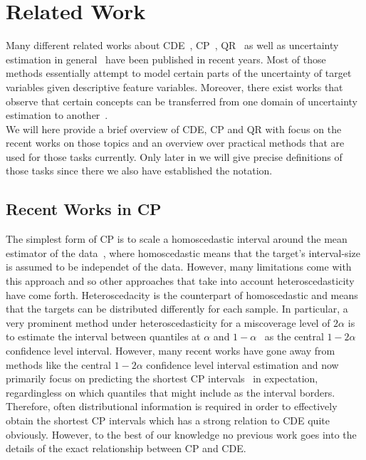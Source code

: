 \section{Related Work}\label{sec:related_work}

Many different related works about CDE~\cite{bishop1994mixture, rothfuss2019conditional, trippe2018conditional, rothfuss2019noise, ambrogioni2017kernel}, CP~\cite{izbicki2022cd, chernozhukov2021distributional,romano2019conformalized, Papadopoulos08, angelopoulos2021gentle}, QR~\cite{chung2020beyond} as well as uncertainty estimation in general~\cite{gal_dropout_2016, hullermeier_aleatoric_2021, abdar2021review, klotz2021uncertainty} have been published in recent years. Most of those methods essentially attempt to model certain parts of the uncertainty of target variables given descriptive feature variables. Moreover, there exist works that observe that certain concepts can be transferred from one domain of uncertainty estimation to another~\cite{chernozhukov2021distributional}.\\
We will here provide a brief overview of CDE, CP and QR with focus on the recent works on those topics and an overview over practical methods that are used for those tasks currently. Only later in  we will give precise definitions of those tasks since there we also have established the notation.

\subsection{Recent Works in CP}

The simplest form of CP is to scale a homoscedastic interval around the mean estimator of the data~\cite{lei2018distribution}, where homoscedastic means that the target's interval-size is assumed to be independet of the data. However, many limitations come with this approach and so other approaches that take into account heteroscedasticity have come forth. Heteroscedacity is the counterpart of homoscedastic and means that the targets can be distributed differently for each sample. In particular, a very prominent method under heteroscedasticity for a miscoverage level of $2 \alpha$ is to estimate the interval between quantiles at $\alpha$ and $1 - \alpha$~\cite{romano2019conformalized} as the central $1 - 2 \alpha$ confidence level interval. However, many recent works have gone away from methods like the central $1 - 2 \alpha$ confidence level interval estimation and now primarily focus on predicting the shortest CP intervals~\cite{sesia2021conformal,chernozhukov2021distributional,izbicki2022cd} in expectation, regardingless on which quantiles that might include as the interval borders. Therefore, often distributional information is required in order to effectively obtain the shortest CP intervals which has a strong relation to CDE quite obviously. However, to the best of our knowledge no previous work goes into the details of the exact relationship between CP and CDE.\@

